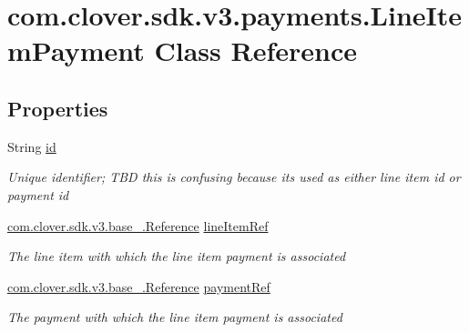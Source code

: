 \hypertarget{classcom_1_1clover_1_1sdk_1_1v3_1_1payments_1_1_line_item_payment}{}\section{com.\+clover.\+sdk.\+v3.\+payments.\+Line\+Item\+Payment Class Reference}
\label{classcom_1_1clover_1_1sdk_1_1v3_1_1payments_1_1_line_item_payment}
\subsection*{Properties}
\begin{DoxyCompactItemize}
\item 
String \hyperlink{classcom_1_1clover_1_1sdk_1_1v3_1_1payments_1_1_line_item_payment_a19f8b804bac28e8fa235de4a23710a49}{id}
\begin{DoxyCompactList}\small\item\em Unique identifier; T\+BD this is confusing because it\textquotesingle{}s used as either line item id or payment id \end{DoxyCompactList}\item 
\hyperlink{classcom_1_1clover_1_1sdk_1_1v3_1_1base___1_1_reference}{com.\+clover.\+sdk.\+v3.\+base\+\_\+.\+Reference} \hyperlink{classcom_1_1clover_1_1sdk_1_1v3_1_1payments_1_1_line_item_payment_ae3aab07fae00a8f6fd53bda31ddd68ea}{line\+Item\+Ref}
\begin{DoxyCompactList}\small\item\em The line item with which the line item payment is associated \end{DoxyCompactList}\item 
\hyperlink{classcom_1_1clover_1_1sdk_1_1v3_1_1base___1_1_reference}{com.\+clover.\+sdk.\+v3.\+base\+\_\+.\+Reference} \hyperlink{classcom_1_1clover_1_1sdk_1_1v3_1_1payments_1_1_line_item_payment_ac6336c40357dcae5337ca7be65758f43}{payment\+Ref}
\begin{DoxyCompactList}\small\item\em The payment with which the line item payment is associated \end{DoxyCompactList}\item 

\end{DoxyCompactItemize}
